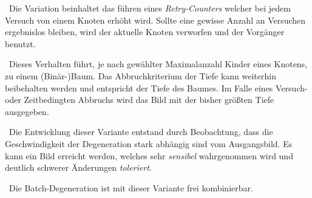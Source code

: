 ~\newline Die Variation beinhaltet das führen eines \textit{Retry-Counters} welcher bei jedem Versuch von einem Knoten erhöht wird. Sollte eine gewisse Anzahl an Versuchen ergebnislos bleiben, wird der aktuelle Knoten verworfen und der Vorgänger benutzt. 

~\newline Dieses Verhalten führt, je nach gewählter Maximalanzahl Kinder eines Knotens, zu einem (Binär-)Baum. Das Abbruchkriterium der Tiefe kann weiterhin beibehalten werden und entspricht der Tiefe des Baumes. Im Falle eines Versuch- oder Zeitbedingten Abbruchs wird das Bild mit der bisher größten Tiefe ausgegeben.

~\newline Die Entwicklung dieser Variante entstand durch Beobachtung, dass die Geschwindigkeit der Degeneration stark abhängig sind vom Ausgangsbild. Es kann ein Bild erreicht werden, welches sehr \textit{sensibel} wahrgenommen wird und deutlich schwerer Änderungen \textit{toleriert}.

~\newline Die Batch-Degeneration ist mit dieser Variante frei kombinierbar.  